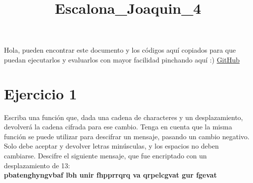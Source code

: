 \documentclass[a4paper,10pt]{article}
\title{Escalona\_Joaquin\_4}
\begin{document}
\maketitle

Hola, pueden encontrar este documento y los códigos aquí copiados para que puedan ejecutarlos y evaluarlos con mayor facilidad pinchando aquí :) \href{https://github.com/joescalona/Programacion-Astronomica/tree/master/Tarea%204}{GitHub}

\section*{Ejercicio 1}
Escriba una función que, dada una cadena de characteres y un desplazamiento, devolverá la cadena cifrada para ese cambio. Tenga en cuenta que la misma función se puede utilizar para descifrar un mensaje, pasando un cambio negativo. Solo debe aceptar y devolver letras minúsculas, y los espacios no deben cambiarse. Descifre el siguiente mensaje, que fue encriptado con un desplazamiento de 13:\\

\textbf{pbatenghyngvbaf lbh unir fhpprrqrq va qrpelcgvat gur fgevat}
\end{document}

